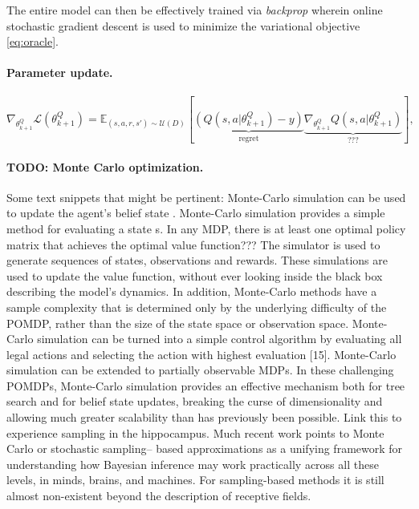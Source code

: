 \documentclass{article} %
\begin{document}
The entire model can then be effectively trained via \textit{backprop}
wherein online stochastic gradient descent is used to minimize the
variational objective \eqref{eq:oracle}.

\paragraph{Parameter update.}
\begin{equation}
  \nabla_{\theta^Q_{k+1}}\mathcal L(\theta^Q_{k+1})
  = \mathbb E_{(s, a, r, s') \sim \mathcal U(D)}\left[\underbrace{(Q(s, a|\theta^Q_{k+1}) - y)}_{\text{regret}}
    \underbrace{\nabla_{\theta^Q_{k+1}}Q(s, a|\theta^Q_{k+1})}_{\text{???}}\right],
  \label{eq:oracle}
\end{equation}

\paragraph{TODO: Monte Carlo optimization.}
Some text snippets that might be pertinent:
Monte-Carlo simulation can be used to update the agent’s belief state
\citep{silver2010monte}.
Monte-Carlo simulation provides a simple method for evaluating
a state s.
In any MDP, there is at least one optimal policy matrix that
achieves the optimal value function???
The simulator is used to generate sequences of states, observations and rewards. These simulations are used to update the value function, without ever looking inside the black box describing the model’s dynamics. In addition, Monte-Carlo methods have a sample complexity that is determined only by the underlying difficulty of the POMDP, rather than the size of the state space or observation space.
Monte-Carlo simulation can be turned into a simple control algorithm by evaluating all legal actions and selecting the action with highest evaluation [15]. Monte-Carlo simulation can be extended to partially observable MDPs.
In these challenging POMDPs, Monte-Carlo simulation provides an effective mechanism both for tree search and for belief state updates, breaking the curse of dimensionality and allowing much greater scalability than has previously been possible.
Link this to experience sampling in the hippocampus.
Much recent work points to Monte Carlo or stochastic sampling– based approximations as a unifying framework for understanding how Bayesian inference may work practically across all these levels, in minds, brains, and machines.
For sampling-based methods it is still almost non-existent beyond the description of receptive fields.
\end{document}
